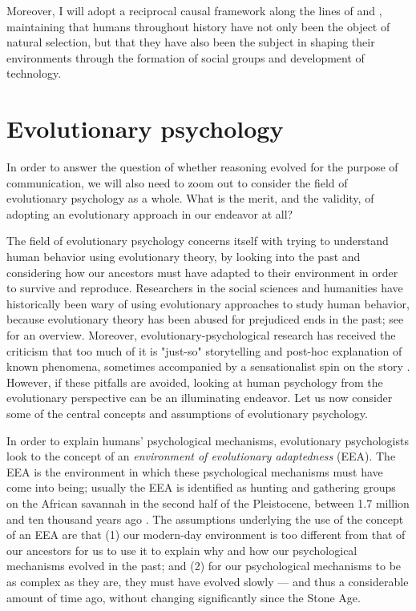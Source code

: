 
Moreover, I will adopt a reciprocal causal framework along the lines of \citet{Laland13} and \citet{Svensson18}, maintaining that humans throughout history have not only been the object of natural selection, but that they have also been the subject in shaping their environments through the formation of social groups and development of technology.

\section{Evolutionary psychology}
\label{sec:evol-psych}
In order to answer the question of whether reasoning evolved for the purpose of communication, we will also need to zoom out to consider the field of evolutionary psychology as a whole. What is the merit, and the validity, of adopting an evolutionary approach in our endeavor at all?

The field of evolutionary psychology concerns itself with trying to understand human behavior using evolutionary theory, by looking into the past and considering how our ancestors must have adapted to their environment in order to survive and reproduce.
Researchers in the social sciences and humanities have historically been wary of using evolutionary approaches to study human behavior, because evolutionary theory has been abused for prejudiced ends in the past; see \citet[pp.~19--20]{LB02} for an overview. Moreover, evolutionary-psychological research has received the criticism that too much of it is "just-so" storytelling and post-hoc explanation of known phenomena, sometimes accompanied by a sensationalist spin on the story \citep{LB02}.
However, if these pitfalls are avoided, looking at human psychology from the evolutionary perspective can be an illuminating endeavor.
Let us now consider some of the central concepts and assumptions of evolutionary psychology.

In order to explain humans' psychological mechanisms, evolutionary psychologists look to the concept of an \emph{environment of evolutionary adaptedness} (EEA). The EEA is the environment in which these psychological mechanisms must have come into being; usually the EEA is identified as hunting and gathering groups on the African savannah in the second half of the Pleistocene, between 1.7 million and ten thousand years ago \citep{LB02}. 
The assumptions underlying the use of the concept of an EEA are that (1) our modern-day environment is too different from that of our ancestors for us to use it to explain why and how our psychological mechanisms evolved in the past; and (2) for our psychological mechanisms to be as complex as they are, they must have evolved slowly --- and thus a considerable amount of time ago, without changing significantly since the Stone Age.

